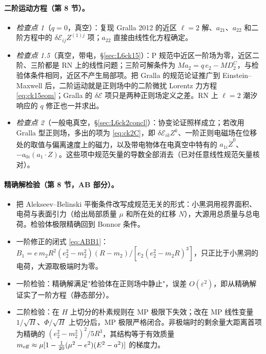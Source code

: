 \documentclass[11pt,a4paper]{ctexart}
\numberwithin{equation}{section}
\begin{document}
\paragraph{二阶运动方程（第 8 节）。}
\begin{itemize}
\item \emph{检查点 1}（$q=0$，真空）：复现 Gralla 2012 的近区 $\ell=2$ 解、$a_{21}$、$a_{22}$ 和二阶方程中的 $\delta\mathcal E_{ij}Z^{(1)j}$ 项；$a_{22}$ 直接由线性化方程确定。
\item \emph{检查点 1.5}（真空，带电，\S\ref{sec:L6ck15}）：P 规范中近区一阶场为零，近区二阶、三阶都是 RN 上的线性问题；三阶可解条件为 $Ma_2=q\,e_2-MD^C_2$，与检验体条件相同，近区不产生局部项。把 Gralla 的规范论证推广到 Einstein--Maxwell 后，二阶运动就是正则场中的二阶微扰 Lorentz 力方程 \eqref{eq:ck15eom}；Gralla 的 $\delta\mathcal E$ 项只是两种正则场定义之差。RN 上 $\ell=2$ 潮汐响应的 $q$ 修正也一并求出。
\item \emph{检查点 2}（一般电真空，\S\ref{sec:L6ck2concl}）：协变论证照样成立；若改用 Gralla 型正则场，多出的项为 \eqref{eq:ck2C}，即 $\delta\mathcal E_{ik}Z^k$、一阶正则电磁场在位移处的取值与偏离速度上的磁力，以及带电物体在电真空中特有的 $a_{1i}\dot Z^0$、$-a_{0i}(a_1\cdot Z)$。这些项中规范矢量的导数全部消去（已对任意线性规范矢量核对）。
\end{itemize}

\paragraph{精确解检验（第 8 节，AB 部分）。}
\begin{itemize}
\item 把 Alekseev--Belinski 平衡条件改写成规范无关的形式：小黑洞用视界面积、电荷与表面引力（给出局部质量 $\mu$ 和所在处的红移 $N$），大源用总质量与总电荷。检验体极限精确回到 Bonnor 条件。
\item 一阶修正的闭式 \eqref{eq:ABB1}：$B_1=e\,m_2R^2(e_2^2-m_2^2)(R-m_2)/[e_2(e_2^2-m_2R)^3]$，只正比于小黑洞的电荷，大源取极端时为零。
\item 一阶检验：精确解满足"检验体在正则场中静止"，误差 $O(\varepsilon^2)$，即从精确解证实了一阶方程（静态部分）。
\item 二阶检验：在 $H$ 上切分的朴素规则在 MP 极限下失效；改在 MP 线性变量 $1/\sqrt H$、$\Phi/\sqrt H$ 上切分后，MP 极限严格闭合。非极端时的剩余量大距离首项为精确的 $(e_2^2-m_2^2)^2/5R^3$，其结构等于有效质量 $m_{\rm eff}\approx\mu[1-\tfrac1{20}(\mu^2-e^2)(E^2-a^2)]$ 的梯度力。
\end{itemize}
\end{document}
